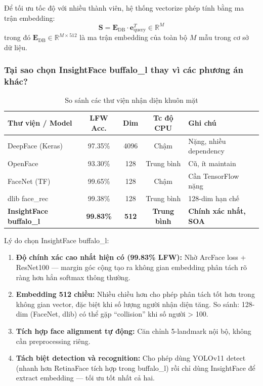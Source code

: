 \medskip
Để tối ưu tốc độ với nhiều thành viên, hệ thống vectorize phép tính bằng ma trận embedding:
\begin{equation}
    \mathbf{S} = \mathbf{E}_{\text{DB}} \cdot \mathbf{e}_{\text{query}}^T \in \mathbb{R}^{M}
\end{equation}
trong đó $\mathbf{E}_{\text{DB}} \in \mathbb{R}^{M \times 512}$ là ma trận embedding của toàn bộ $M$ mẫu trong cơ sở dữ liệu.

\subsubsection{Tại sao chọn InsightFace buffalo\_l thay vì các phương án khác?}
\label{subsubsec:whyinsightface}

\begin{table}[H]
\centering
\caption{So sánh các thư viện nhận diện khuôn mặt}
\label{tab:recognizer_compare}
{\small
\begin{tabular}{|l|c|c|c|p{3.8cm}|}
\hline
\textbf{Thư viện / Model} & \textbf{LFW Acc.} & \textbf{Dim} & \textbf{Tc độ CPU} & \textbf{Ghi chú} \\
\hline
DeepFace (Keras) & 97.35\% & 4096 & Chậm & Nặng, nhiều dependency \\
\hline
OpenFace & 93.30\% & 128 & Trung bình & Cũ, ít maintain \\
\hline
FaceNet (TF) & 99.65\% & 128 & Chậm & Cần TensorFlow nặng \\
\hline
dlib face\_rec & 99.38\% & 128 & Trung bình & 128-dim hạn chế \\
\hline
\textbf{InsightFace buffalo\_l} & \textbf{99.83\%} & \textbf{512} & \textbf{Trung bình} & \textbf{Chính xác nhất, SOA} \\
\hline
\end{tabular}
}
\end{table}

Lý do chọn InsightFace buffalo\_l:
\begin{enumerate}[1.]
    \item \textbf{Độ chính xác cao nhất hiện có (99.83\% LFW):} Nhờ ArcFace loss + ResNet100 --- margin góc cộng tạo ra không gian embedding phân tách rõ ràng hơn hẳn softmax thông thường.
    \item \textbf{Embedding 512 chiều:} Nhiều chiều hơn cho phép phân tách tốt hơn trong không gian vector, đặc biệt khi số lượng người nhận diện tăng. So sánh: 128-dim (FaceNet, dlib) có thể gặp ``collision'' khi số người > 100.
    \item \textbf{Tích hợp face alignment tự động:} Căn chỉnh 5-landmark nội bộ, không cần preprocessing riêng.
    \item \textbf{Tách biệt detection và recognition:} Cho phép dùng YOLOv11 detect (nhanh hơn RetinaFace tích hợp trong buffalo\_l) rồi chỉ dùng InsightFace để extract embedding --- tối ưu tốt nhất cả hai.
\end{enumerate}

